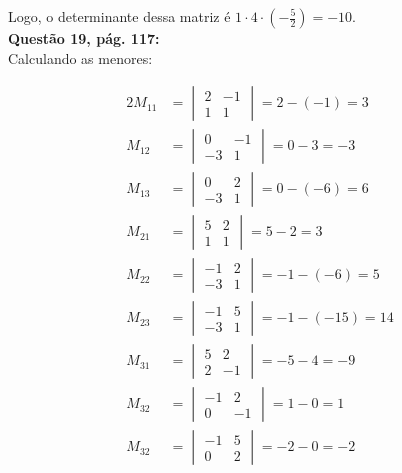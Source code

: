 \documentclass[a4paper,12pt]{article}
\begin{document}
Logo, o determinante dessa matriz é $1 \cdot 4 \cdot \left( -\frac{5}{2} \right) = -10$.\\

\textbf{Questão 19, pág. 117:}\\

Calculando as menores:

\begin{alignat*}{2}
  M_{11} &=
  \begin{vmatrix}
    2  & -1\\
    1 &  1
  \end{vmatrix}
  = 2 - (-1) = 3 \\
  M_{12} &=
  \begin{vmatrix}
    0  & -1\\
    -3 &  1
  \end{vmatrix}
  = 0 - 3 = -3 \\
  M_{13} &=
  \begin{vmatrix}
    0  & 2\\
    -3 &  1
  \end{vmatrix}
  = 0 - (-6) = 6 \\
  M_{21} &= 
  \begin{vmatrix}
    5  & 2\\
    1 &  1
  \end{vmatrix}
  = 5 - 2 = 3 \\
  M_{22} &= 
  \begin{vmatrix}
    -1  & 2\\
    -3 &  1
  \end{vmatrix}
  = -1 - (-6) = 5 \\
  M_{23} &=
  \begin{vmatrix}
    -1  & 5\\
    -3 &  1
  \end{vmatrix}
  = -1 - (-15) = 14 \\
  M_{31} &=
  \begin{vmatrix}
    5  & 2\\
    2 &  -1
  \end{vmatrix}
  = -5 - 4 = -9 \\
  M_{32} &= 
  \begin{vmatrix}
    -1  & 2\\
    0 &  -1
  \end{vmatrix}
  = 1 - 0 = 1 \\
  M_{32} &= 
  \begin{vmatrix}
    -1  & 5\\
    0 &  2
  \end{vmatrix}
  = -2 - 0 = -2 \\
\end{alignat*}
\end{document}
